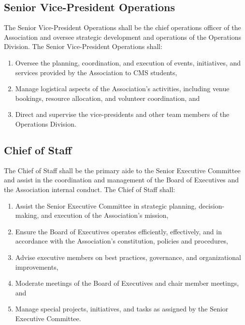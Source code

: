 \subsection{Senior Vice-President Operations}
The Senior Vice-President Operations shall be the chief operations
officer of the Association and oversee strategic development and
operations of the Operations Division. 
The Senior Vice-President Operations shall:
\begin{enumerate}

    \item Oversee the planning, coordination, and execution of
    events, initiatives, and services provided by the Association
    to CMS students,

    \item Manage logistical aspects of the Association's activities,
    including venue bookings, resource allocation, and volunteer
    coordination, and

    \item Direct and supervise the vice-presidents and other team 
    members of the Operations Division.

\end{enumerate}

\subsection{Chief of Staff}
The Chief of Staff shall be the primary aide to the Senior Executive
Committee and assist in the coordination and management of the Board
of Executives and the Association internal conduct.
The Chief of Staff shall:
\begin{enumerate}

    \item Assist the Senior Executive Committee in strategic planning,
    decision-making, and execution of the Association's mission,

    \item Ensure the Board of Executives operates efficiently, effectively,
    and in accordance with the Association's constitution, policies and 
    procedures,

    \item Advise executive members on best practices, governance, and
    organizational improvements,

    \item Moderate meetings of the Board of Executives and chair member
    meetings, and

    \item Manage special projects, initiatives, and tasks as assigned
    by the Senior Executive Committee.

\end{enumerate}

